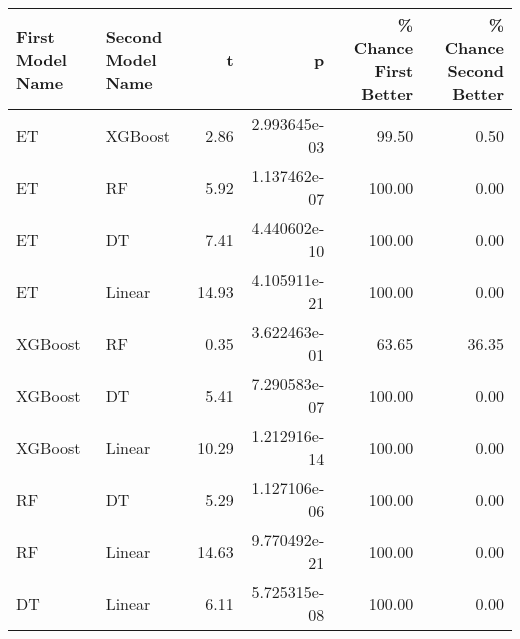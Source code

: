 \begin{tabular}{llrrrr}
\toprule
First Model Name & Second Model Name &     t &            p &  \% Chance First Better &  \% Chance Second Better \\
\midrule
              ET &           XGBoost &  2.86 & 2.993645e-03 &                  99.50 &                    0.50 \\
              ET &                RF &  5.92 & 1.137462e-07 &                 100.00 &                    0.00 \\
              ET &                DT &  7.41 & 4.440602e-10 &                 100.00 &                    0.00 \\
              ET &            Linear & 14.93 & 4.105911e-21 &                 100.00 &                    0.00 \\
         XGBoost &                RF &  0.35 & 3.622463e-01 &                  63.65 &                   36.35 \\
         XGBoost &                DT &  5.41 & 7.290583e-07 &                 100.00 &                    0.00 \\
         XGBoost &            Linear & 10.29 & 1.212916e-14 &                 100.00 &                    0.00 \\
              RF &                DT &  5.29 & 1.127106e-06 &                 100.00 &                    0.00 \\
              RF &            Linear & 14.63 & 9.770492e-21 &                 100.00 &                    0.00 \\
              DT &            Linear &  6.11 & 5.725315e-08 &                 100.00 &                    0.00 \\
\bottomrule
\end{tabular}
